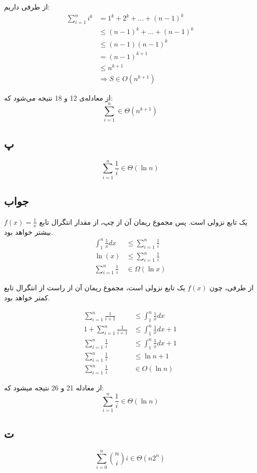 \documentclass[]{article}
\begin{document}
از طرفی داریم:
\begin{align}
    \sum_{i=1}^n i^k &= 1^k + 2^k + \ldots + (n-1)^k\\
    &\leq (n-1)^k + \ldots + (n-1)^k\\
    &\leq (n-1)(n-1)^k\\
    &= (n-1)^{k+1}\\
    &\leq n^{k+1}\\
    &\Rightarrow S \in O(n^{k+1})
\end{align}


از معادله‌ی 12 و 18 نتیجه می‌شود که:
$$\displaystyle \sum_{i=1}^n \in \Theta(n^{k+1})$$

\subsection{پ}
$$\displaystyle \sum_{i = 1}^n \frac{1}{i} \in \Theta(\ln{n})$$
\subsection*{جواب}
$f(x) = \frac{1}{x}$
یک تابع نزولی است. پس مجموع ریمان آن از چپ، از مقدار انتگرال تابع بیشتر خواهد بود.
\begin{align}
\displaystyle \int_{1}^{n} \frac{1}{x} dx &\leq \sum_{i= 1}^n \frac{1}{i} \\
\ln(x) &\leq \sum_{i=1}^n \frac{1}{i} \\
\sum_{i=1}^n \frac{1}{i} &\in \Omega(\ln{x})
\end{align}

از طرفی، چون $f(x)$ یک تابع نزولی است، مجموع ریمان آن از راست از انتگرال تابع کمتر خواهد بود.

\begin{align}
    \sum_{i=1}^n \frac{1}{i+1} &\le \int_{1}^n \frac{1}{x} dx \\
    1 + \sum_{i=1}^n \frac{1}{i+1} &\le \int_{1}^n \frac{1}{x} dx + 1 \\
    \sum_{i=1}^n \frac{1}{i} &\le \int_{1}^n \frac{1}{x} dx + 1\\
    \sum_{i=1}^n \frac{1}{i} &\le \ln{n} + 1 \\
    \sum_{i=1}^n \frac{1}{i} &\in O (\ln{n})
\end{align}

از معادله 21 و 26 نتیجه میشود که:
$$\displaystyle \sum_{i=1}^n \frac{1}{i} \in \Theta (\ln{n}) $$

\pagebreak
\subsection{ت}
$$\displaystyle \sum_{i = 0}^n \binom{n}{i}i \in \Theta(n2^n)$$
\end{document}
